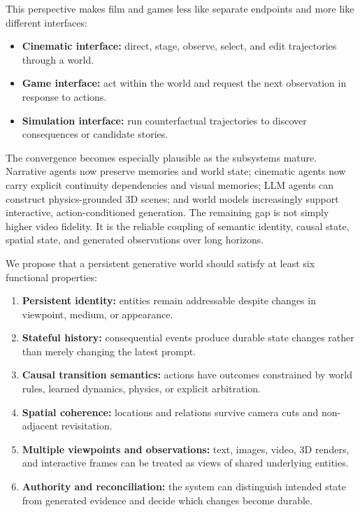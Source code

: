 \documentclass{article}
\begin{document}
This perspective makes film and games less like separate endpoints and more like different interfaces:

\begin{itemize}[leftmargin=*]
  \item \textbf{Cinematic interface:} direct, stage, observe, select, and edit trajectories through a world.
  \item \textbf{Game interface:} act within the world and request the next observation in response to actions.
  \item \textbf{Simulation interface:} run counterfactual trajectories to discover consequences or candidate stories.
\end{itemize}

The convergence becomes especially plausible as the subsystems mature. Narrative agents now preserve memories and world state; cinematic agents now carry explicit continuity dependencies and visual memories; LLM agents can construct physics-grounded 3D scenes; and world models increasingly support interactive, action-conditioned generation. The remaining gap is not simply higher video fidelity. It is the reliable coupling of semantic identity, causal state, spatial state, and generated observations over long horizons.

We propose that a persistent generative world should satisfy at least six functional properties:

\begin{enumerate}[leftmargin=*]
  \item \textbf{Persistent identity:} entities remain addressable despite changes in viewpoint, medium, or appearance.
  \item \textbf{Stateful history:} consequential events produce durable state changes rather than merely changing the latest prompt.
  \item \textbf{Causal transition semantics:} actions have outcomes constrained by world rules, learned dynamics, physics, or explicit arbitration.
  \item \textbf{Spatial coherence:} locations and relations survive camera cuts and non-adjacent revisitation.
  \item \textbf{Multiple viewpoints and observations:} text, images, video, 3D renders, and interactive frames can be treated as views of shared underlying entities.
  \item \textbf{Authority and reconciliation:} the system can distinguish intended state from generated evidence and decide which changes become durable.
\end{enumerate}
\end{document}
